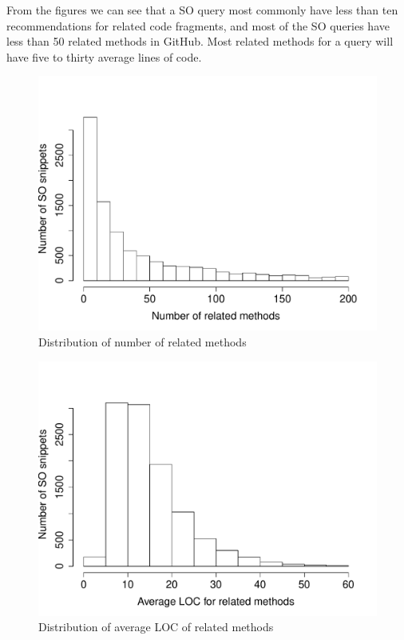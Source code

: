 From the figures we can see that a SO query most commonly have less than ten recommendations for related code fragments, and most of the SO queries have less than 50 related methods in GitHub. Most related methods for a query will have five to thirty average lines of code.

\begin{figure}
	\includegraphics[scale=0.4]{figures/dist-related.pdf}
	\caption{Distribution of number of related methods}
	\label{fig:num-related}
\end{figure}

\begin{figure}
	\includegraphics[scale=0.4]{figures/dist-loc.pdf}
	\caption{Distribution of average LOC of related methods}
	\label{fig:avg-loc}
\end{figure}

